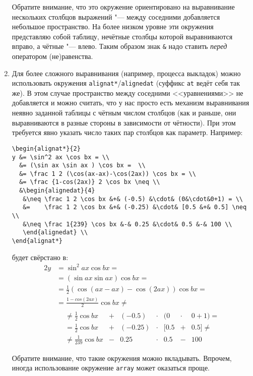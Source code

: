 \begin{enumerate}
	Обратите внимание, что это окружение ориентировано на выравнивание
	нескольких столбцов выражений "--- между соседними добавляется небольшое пространство.
	На более низком уровне эти окружения представляю собой таблицу, нечётные столбцы
	которой выравниваются вправо, а чётные "--- влево.
	Таким образом знак \verb'&' надо ставить \textit{перед} оператором (не)равенства.

\item
	Для более сложного выравнивания (например, процесса выкладок) можно использовать
	окружения \texttt{alignat*}/\texttt{alignedat} (суффикс \texttt{at} ведёт себя так же).
	В этом случае пространство между соседними <<уравнениями>> не добавляется и можно
	считать, что у нас просто есть механизм выравнивания неявно заданной таблицы с чётным
	числом столбцов (как и раньше, они выравниваются в разные стороны в зависимости от чётности).
	При этом требуется явно указать число таких пар столбцов как параметр.
	Например:
\begin{verbatim}
\begin{alignat*}{2}
y &= \sin^2 ax \cos bx = \\
  &= (\sin ax \sin ax ) \cos bx =  \\
  &= \frac 1 2 (\cos(ax-ax)-\cos(2ax)) \cos bx = \\
  &= \frac {1-cos(2ax)} 2 \cos bx \neq \\
  &\begin{alignedat}{4}
   &\neq \frac 1 2 \cos bx &+& (-0.5) &\cdot& (0&\cdot&0+1) = \\
   &=    \frac 1 2 \cos bx &+& (-0.25) &\cdot& [0.5 &+& 0.5] \neq \\
   &\neq \frac 1{239} \cos bx &-& 0.25 &\cdot& 0.5 &-& 100 \\
   \end{alignedat} \\
\end{alignat*}
\end{verbatim}
будет свёрстано в:
\begin{alignat*}{2}
y &= \sin^2 ax \cos bx = \\
  &= (\sin ax \sin ax ) \cos bx =  \\
  &= \frac 1 2 (\cos(ax-ax)-\cos(2ax)) \cos bx = \\
  &= \frac {1-cos(2ax)} 2 \cos bx \neq \\
  &\begin{alignedat}{4}
   &\neq \frac 1 2 \cos bx &+& (-0.5) &\cdot& (0&\cdot&0+1) = \\
   &=    \frac 1 2 \cos bx &+& (-0.25) &\cdot& [0.5 &+& 0.5] \neq \\
   &\neq \frac 1{239} \cos bx &-& 0.25 &\cdot& 0.5 &-& 100 \\
   \end{alignedat} \\
\end{alignat*}
	Обратите внимание, что такие окружения можно вкладывать.
	Впрочем, иногда использование окружение \texttt{array} может оказаться проще.


\end{enumerate}
